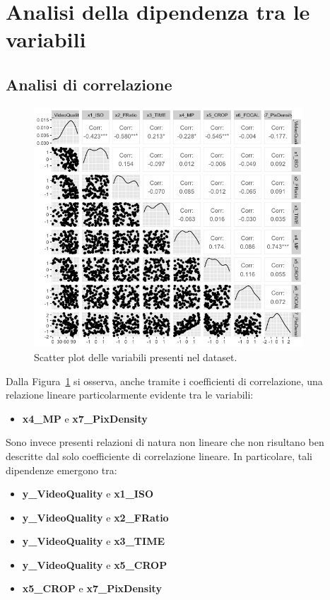 \section{Analisi della dipendenza tra le variabili}

\subsection{Analisi di correlazione}
\begin{figure}[H]
	\centering
	\includegraphics[width=0.90\textwidth]{../graphs/DescriptiveStatisticPlots/ggplot}
	\caption{Scatter plot delle variabili presenti nel dataset.}
	\label{fig:scatter}
\end{figure}

Dalla Figura~\ref{fig:scatter} si osserva, anche tramite i coefficienti di correlazione, una relazione lineare particolarmente evidente tra le variabili:
\begin{itemize}
	\item \textbf{x4\_MP} e \textbf{x7\_PixDensity}
\end{itemize}

Sono invece presenti relazioni di natura non lineare che non risultano ben descritte dal solo coefficiente di correlazione lineare. In particolare, tali dipendenze emergono tra:
\begin{itemize}
	\item \textbf{y\_VideoQuality} e \textbf{x1\_ISO}
	\item \textbf{y\_VideoQuality} e \textbf{x2\_FRatio}
	\item \textbf{y\_VideoQuality} e \textbf{x3\_TIME}
	\item \textbf{y\_VideoQuality} e \textbf{x5\_CROP}
	\item \textbf{x5\_CROP} e \textbf{x7\_PixDensity}
\end{itemize}

